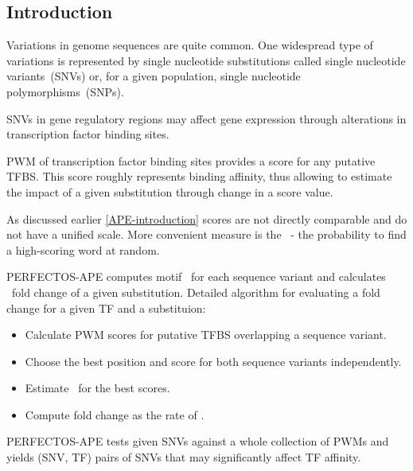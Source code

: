 \subsection{Introduction}
Variations in genome sequences are quite common. One widespread type of variations is represented by single nucleotide substitutions called single nucleotide variants~(SNVs) or, for a given population, single nucleotide polymorphisms~(SNPs).

SNVs in gene regulatory regions may affect gene expression through alterations in transcription factor binding sites.

PWM of transcription factor binding sites provides a score for any putative TFBS.
This score roughly represents binding affinity, thus allowing to estimate 
the impact of a given substitution through change in a score value.

As discussed earlier \ref{APE-introduction} scores are not directly comparable and do not have a unified scale. More convenient measure is the \pvalue\ - the probability to find a high-scoring word at random.

PERFECTOS-APE computes motif \pvalues\ for each sequence variant and calculates \pvalue\ fold change of a given substitution. Detailed algorithm for evaluating a fold change for a given TF and a substituion:

\begin{itemize}
\item Calculate PWM scores for putative TFBS overlapping a sequence variant.
\item Choose the best position and score for both sequence variants independently.
\item Estimate \pvalues\ for the best scores.
\item Compute fold change as the rate of \pvalues.
\end{itemize}

PERFECTOS-APE tests given SNVs against a whole collection of PWMs and yields (SNV, TF) pairs of SNVs that may significantly affect TF affinity.
